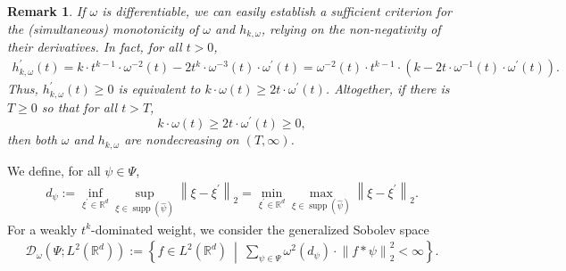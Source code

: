 \documentclass[11pt]{amsart}
\newcommand{\R}{{\mathbb{R}}}
\newcommand{\norm}[1]{\ensuremath{\left\lVert\text{}#1\text{}\right\rVert}}
\newcommand{\set}[1]{\ensuremath{\left\{\text{}#1\text{}\right\}}}
\DeclareMathOperator{\supp}{supp}
\newtheorem{remark}[theorem]{Remark}
\newenvironment{proof sketch} {\textit{Proof sketch.}}{}
\begin{document}
  \begin{remark}\label{rm: Sufficient condition if the weight is differentiable}
    If $\omega$ is differentiable, we can easily establish a sufficient criterion for the (simultaneous) monotonicity of $\omega$ and $h_{k,\omega}$, relying on the non-negativity of their derivatives. In fact, for all $t>0$, 
    \begin{align*}
      h_{k,\omega}^\prime(t)=k\cdot t^{k-1} \cdot \omega^{-2}(t) - 2 t^k \cdot \omega^{-3}(t) \cdot \omega^\prime(t)
      = \omega^{-2}(t) \cdot t^{k-1} \cdot \left(k-2t\cdot \omega^{-1}(t) \cdot \omega^\prime(t)\right).
    \end{align*}
    Thus, $h_{k,\omega}^\prime(t)\geq 0$ is equivalent to $k\cdot \omega(t)\geq 2 t \cdot \omega^\prime(t)$. Altogether, if there is $T\geq 0$ so that for all $t>T$, 
    \[k\cdot \omega(t)\geq 2 t \cdot \omega^\prime(t)\geq 0,\]
    then both $\omega$ and $h_{k,\omega}$ are nondecreasing on $(T,\infty)$.
  \end{remark}
  
  We define, for all $\psi \in \Psi$,
  \begin{align}\label{def: diameter of spectral support of a filter}
    d_\psi:=\inf_{\xi^\prime \in \R^d}\sup_{\xi \in \supp(\widehat{\psi})} \norm{\xi-\xi^\prime}_2=\min_{\xi^\prime \in \R^d}\max_{\xi \in \supp(\widehat{\psi})} \norm{\xi-\xi^\prime}_2.
  \end{align}
  For a weakly $t^k$-dominated weight, we consider the generalized Sobolev space 
  \begin{align}\label{def: generalized Sobolev space}
    \mathcal{D}_\omega(\Psi;L^2(\R^d)):=\set{f \in L^2(\R^d)~\middle|~ \sum_{\psi \in \Psi} \omega^2(d_\psi) \cdot \norm{f*\psi}_2^2< \infty}.
  \end{align}
\end{document}
